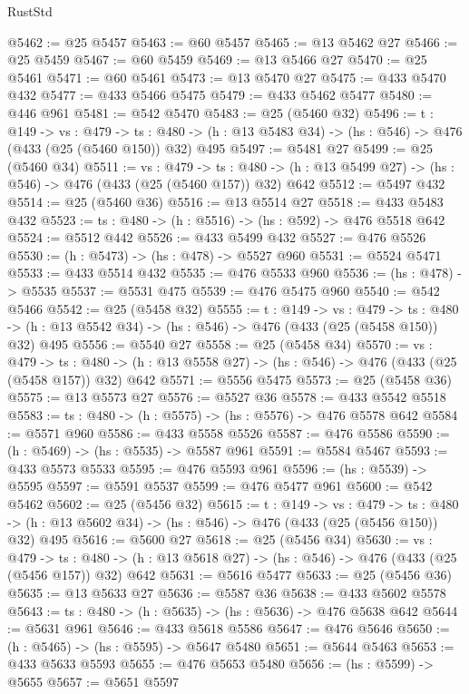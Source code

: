 \begin{lexlean}{RustStd}
\begin{coremodule}
@5462 := @25 @5457
@5463 := @60 @5457
@5465 := @13 @5462 @27
@5466 := @25 @5459
@5467 := @60 @5459
@5469 := @13 @5466 @27
@5470 := @25 @5461
@5471 := @60 @5461
@5473 := @13 @5470 @27
@5475 := @433 @5470 @432
@5477 := @433 @5466 @5475
@5479 := @433 @5462 @5477
@5480 := @446 @961
@5481 := @542 @5470
@5483 := @25 (@5460 @32)
@5496 := {t : @149} ->
  {vs : @479} ->
  {ts : @480} -> (h : @13 @5483 @34) -> (hs : @546) -> @476 (@433 (@25 (@5460 @150)) @32) @495
@5497 := @5481 @27
@5499 := @25 (@5460 @34)
@5511 := {vs : @479} ->
  {ts : @480} -> (h : @13 @5499 @27) -> (hs : @546) -> @476 (@433 (@25 (@5460 @157)) @32) @642
@5512 := @5497 @432
@5514 := @25 (@5460 @36)
@5516 := @13 @5514 @27
@5518 := @433 @5483 @432
@5523 := {ts : @480} -> (h : @5516) -> (hs : @592) -> @476 @5518 @642
@5524 := @5512 @442
@5526 := @433 @5499 @432
@5527 := @476 @5526
@5530 := (h : @5473) -> (hs : @478) -> @5527 @960
@5531 := @5524 @5471
@5533 := @433 @5514 @432
@5535 := @476 @5533 @960
@5536 := (hs : @478) -> @5535
@5537 := @5531 @475
@5539 := @476 @5475 @960
@5540 := @542 @5466
@5542 := @25 (@5458 @32)
@5555 := {t : @149} ->
  {vs : @479} ->
  {ts : @480} -> (h : @13 @5542 @34) -> (hs : @546) -> @476 (@433 (@25 (@5458 @150)) @32) @495
@5556 := @5540 @27
@5558 := @25 (@5458 @34)
@5570 := {vs : @479} ->
  {ts : @480} -> (h : @13 @5558 @27) -> (hs : @546) -> @476 (@433 (@25 (@5458 @157)) @32) @642
@5571 := @5556 @5475
@5573 := @25 (@5458 @36)
@5575 := @13 @5573 @27
@5576 := @5527 @36
@5578 := @433 @5542 @5518
@5583 := {ts : @480} -> (h : @5575) -> (hs : @5576) -> @476 @5578 @642
@5584 := @5571 @960
@5586 := @433 @5558 @5526
@5587 := @476 @5586
@5590 := (h : @5469) -> (hs : @5535) -> @5587 @961
@5591 := @5584 @5467
@5593 := @433 @5573 @5533
@5595 := @476 @5593 @961
@5596 := (hs : @5539) -> @5595
@5597 := @5591 @5537
@5599 := @476 @5477 @961
@5600 := @542 @5462
@5602 := @25 (@5456 @32)
@5615 := {t : @149} ->
  {vs : @479} ->
  {ts : @480} -> (h : @13 @5602 @34) -> (hs : @546) -> @476 (@433 (@25 (@5456 @150)) @32) @495
@5616 := @5600 @27
@5618 := @25 (@5456 @34)
@5630 := {vs : @479} ->
  {ts : @480} -> (h : @13 @5618 @27) -> (hs : @546) -> @476 (@433 (@25 (@5456 @157)) @32) @642
@5631 := @5616 @5477
@5633 := @25 (@5456 @36)
@5635 := @13 @5633 @27
@5636 := @5587 @36
@5638 := @433 @5602 @5578
@5643 := {ts : @480} -> (h : @5635) -> (hs : @5636) -> @476 @5638 @642
@5644 := @5631 @961
@5646 := @433 @5618 @5586
@5647 := @476 @5646
@5650 := (h : @5465) -> (hs : @5595) -> @5647 @5480
@5651 := @5644 @5463
@5653 := @433 @5633 @5593
@5655 := @476 @5653 @5480
@5656 := (hs : @5599) -> @5655
@5657 := @5651 @5597

\end{coremodule}
\end{lexlean}
